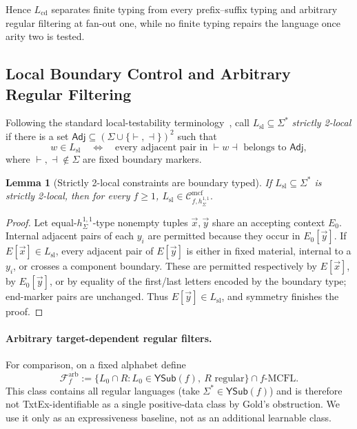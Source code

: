 \documentclass[11pt]{article}
\numberwithin{equation}{section}
\theoremstyle{plain}
\newtheorem{lemma}[theorem]{Lemma}
\theoremstyle{definition}
\theoremstyle{remark}
\newcommand{\Cmcf}[2]{\mathcal{C}^{\mathrm{mcf}}_{#1,#2}}
\newcommand{\tuple}[1]{\vec{#1}}
\newcommand{\YSub}[1]{\mathsf{YSub}(#1)}
\theoremstyle{plain}
\begin{document}
Hence $L_{\mathrm{cd}}$ separates finite typing from every prefix--suffix
typing and arbitrary regular filtering at fan-out one, while no finite typing
repairs the language once arity two is tested.

\subsection{Local Boundary Control and Arbitrary Regular Filtering}
\label{subsec:comparison-separations}

Following the standard local-testability terminology~\cite{McNaughtonPapert1971}, call
$L_{\mathrm{sl}}\subseteq\Sigma^*$ \emph{strictly 2-local} if there is a set
$\mathsf{Adj}\subseteq(\Sigma\cup\{\vdash,\dashv\})^2$ such that
\[
 w\in L_{\mathrm{sl}}
 \quad\Longleftrightarrow\quad
 \text{every adjacent pair in $\vdash w\dashv$ belongs to $\mathsf{Adj}$},
\]
where $\vdash,\dashv\notin\Sigma$ are fixed boundary markers.

\begin{lemma}[Strictly 2-local constraints are boundary typed]
\label{lem:sl2-boundary-control-v1r}
If $L_{\mathrm{sl}}\subseteq\Sigma^*$ is strictly 2-local, then for every $f\ge1$,
\(L_{\mathrm{sl}}\in\Cmcf{f}{h_\Sigma^{1,1}}.\)
\end{lemma}

\begin{proof}
Let equal-$h_\Sigma^{1,1}$-type nonempty tuples $\tuple x,\tuple y$ share an
accepting context $E_0$.  Internal adjacent pairs of each $y_i$ are permitted
because they occur in $E_0[\tuple y]$.  If $E[\tuple x]\in L_{\mathrm{sl}}$,
every adjacent pair of $E[\tuple y]$ is either in fixed material, internal to
a $y_i$, or crosses a component boundary.  These are permitted respectively
by $E[\tuple x]$, by $E_0[\tuple y]$, or by equality of the first/last letters
encoded by the boundary type; end-marker pairs are unchanged.  Thus
$E[\tuple y]\in L_{\mathrm{sl}}$, and symmetry finishes the proof.
\end{proof}

\paragraph{Arbitrary target-dependent regular filters.}
For comparison, on a fixed alphabet define
\[
 \mathcal F_f^{\mathrm{arb}}
 :=\bigl\{L_0\cap R:L_0\in\YSub{f},\ R\text{ regular}\bigr\}
   \cap f\text{-}\mathrm{MCFL}.
\]
This class contains all regular languages
(take $\Sigma^*\in\YSub{f}$) and is therefore
not TxtEx-identifiable as a single
positive-data class by Gold's obstruction.
We use it only as an expressiveness baseline,
not as an additional learnable class.
\end{document}
